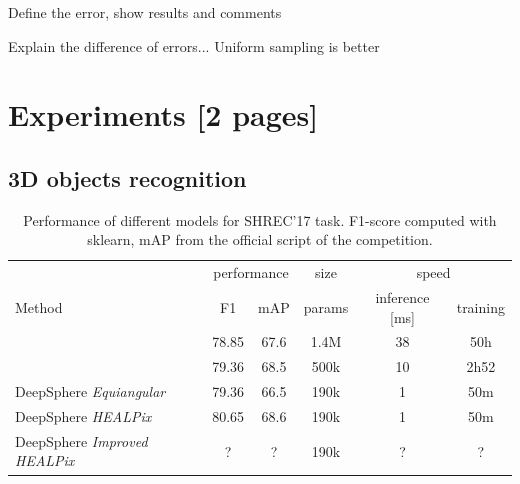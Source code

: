 \documentclass{article} %
\newcommand{\todo}[1]{{\color[rgb]{.6,.1,.6}{#1}}}
\begin{document}
Define the error, show results and comments




Explain the difference of errors... Uniform sampling is better

\section{Experiments [2 pages]}

\todo{
Show: \\
* meet the desiderata \\
* DeepSphere V1 and V2 are equivalent in practice, wait on SHREC and cosmo exp \\
* anisotropy doesn't help \\
}

\subsection{3D objects recognition}

\todo{
* same perf as other spherical CNNs, but 40 times faster \\
* compare samplings (equi, HEALPix) $\Rightarrow$ not much difference \\
* compare with improved graph (Nside=32) $\Rightarrow$ no improvement as information in the low frequencies (PSD, and works down to nside=8) \\
* ModelNet 40: same conclusions $\Rightarrow$ appendix \\
}

\begin{table}
    \centering
    \begin{tabular}{l|c c c c c}
        \multicolumn{1}{l}{} & \multicolumn{2}{c}{performance} & \multicolumn{1}{c}{size} & \multicolumn{2}{c}{speed}\\
        \cmidrule(lr){2-3} \cmidrule(lr){4-4} \cmidrule(lr){5-6}
        \multicolumn{1}{l}{Method} & F1 & mAP & params & inference [ms] & training \\ \hline
        \cite{cohen_spherical_2018} & 78.85 & 67.6 & 1.4M & 38 & 50h\\
        \cite{esteves_learning_2017} & 79.36 & 68.5 & 500k & 10 & 2h52\\ \hline
        DeepSphere \emph{Equiangular} & 79.36 & 66.5 & 190k & 1 & 50m \\
        DeepSphere \emph{HEALPix} & 80.65 & 68.6 & 190k & 1 & 50m\\
        DeepSphere \emph{Improved HEALPix} & ? & ? & 190k & ? & ?
    \end{tabular}
    \caption{Performance of different models for SHREC'17 task. F1-score computed with sklearn, mAP from the official script of the competition.}
    \label{tab:SHREC17_class}
\end{table}
\end{document}
